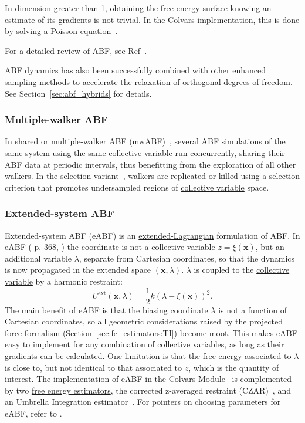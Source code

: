 \documentclass[9pt,review]{livecoms}
\newcommand{\vx}{\mathbf{x}}
\begin{document}
In dimension greater than 1, obtaining the free energy \hyperlink{ref:FES} {surface} knowing an estimate of its gradients is not trivial.
In the Colvars implementation, this is done by solving a Poisson equation~\cite{Lelievre2010, Alrachid2015, Henin2021integration}.

For a detailed review of ABF, see Ref~\cite{Comer2015}.

ABF dynamics has also been successfully combined with other enhanced sampling methods to accelerate the relaxation of orthogonal degrees of freedom. See Section~\ref{sec:abf_hybrids} for details.


\subsubsection{Multiple-walker ABF}
\label{sec:mwABF}

In shared or multiple-walker ABF (mwABF)~\cite{Lelievre2007, Minoukadeh2010, Comer2014mwABF}, several ABF simulations of the same system using the same \hyperlink{ref:CV} {collective variable} run concurrently, sharing their ABF data at periodic intervals, thus benefitting from the exploration of all other walkers.
In the selection variant~\cite{Minoukadeh2010, Comer2014mwABF}, walkers are replicated or killed using a selection criterion that promotes undersampled regions of \hyperlink{ref:CV} {collective variable} space.

\subsubsection{Extended-system ABF}
\label{sec:eABF}

Extended-system ABF (eABF) is an \hyperlink{ref:ExtL} {extended-Lagrangian} formulation of ABF.
In eABF (\cite{Lelievre2010} p. 368, \cite{Zheng2012}) the coordinate is not a \hyperlink{ref:CV} {collective variable} $z = \xi(\vx)$, but an additional variable $\lambda$, separate from Cartesian coordinates, so that the dynamics is now propagated in the extended space $(\vx, \lambda)$.
$\lambda$ is coupled to the \hyperlink{ref:CV} {collective variable} by a harmonic restraint:
\begin{equation}
    U^\mathrm{ext}(\vx, \lambda) = \frac{1}{2} k (\lambda - \xi(\vx))^2 .
\end{equation}
The main benefit of eABF is that the biasing coordinate $\lambda$ is not a function of Cartesian coordinates, so all geometric considerations raised by the projected force formalism (Section~\ref{sec:fe_estimators:TI}) become moot. This makes eABF easy to implement for any combination of \hyperlink{ref:CV} {collective variable}s, as long as their gradients can be calculated.
One limitation is that the free energy associated to $\lambda$ is close to, but not identical to that associated to $z$, which is the quantity of interest.
The implementation of eABF in the Colvars Module~\cite{Lesage2017} is complemented by two \hyperlink{ref:FEestimator} {free energy estimators}, the corrected z-averaged restraint (CZAR)~\cite{Lesage2017}, and an Umbrella Integration estimator~\cite{Kastner2005, Zheng2012, Fu2016}.
For pointers on choosing parameters for eABF, refer to \cite{Fu2016, Lesage2017}.
\end{document}
